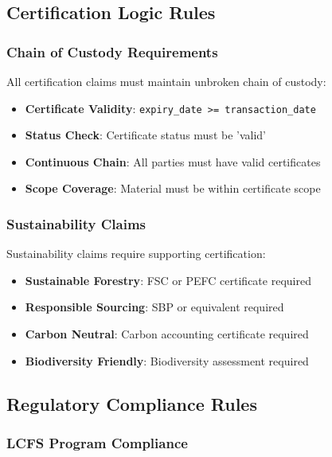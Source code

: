 \subsection{Certification Logic Rules}
\label{sec:certification-logic}

\subsubsection{Chain of Custody Requirements}

All certification claims must maintain unbroken chain of custody:

\begin{itemize}
    \item \textbf{Certificate Validity}: \texttt{expiry\_date >= transaction\_date}
    \item \textbf{Status Check}: Certificate status must be 'valid'
    \item \textbf{Continuous Chain}: All parties must have valid certificates
    \item \textbf{Scope Coverage}: Material must be within certificate scope
\end{itemize}

\subsubsection{Sustainability Claims}

Sustainability claims require supporting certification:

\begin{itemize}
    \item \textbf{Sustainable Forestry}: FSC or PEFC certificate required
    \item \textbf{Responsible Sourcing}: SBP or equivalent required
    \item \textbf{Carbon Neutral}: Carbon accounting certificate required
    \item \textbf{Biodiversity Friendly}: Biodiversity assessment required
\end{itemize}

\subsection{Regulatory Compliance Rules}
\label{sec:regulatory-compliance}

\subsubsection{LCFS Program Compliance}

